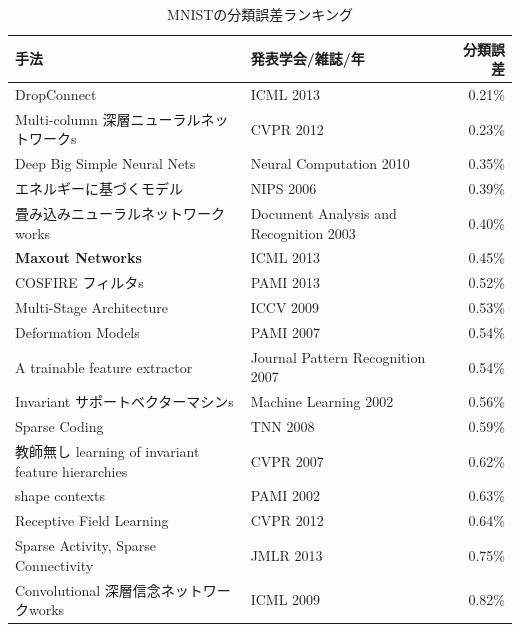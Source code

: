 \begin{table}[htbp]
\begin{center}
  \caption{MNISTの分類誤差ランキング}
    \begin{tabular}{|l|l|r|}\hline
    手法 & 発表学会/雑誌/年 & 分類誤差 \\ \hline
    DropConnect \cite{wan2013regularization}& ICML 2013 & 0.21\% \\ \hline
    Multi-column 深層ニューラルネットワークs \cite{ciresan2012multi-column}& CVPR 2012 & 0.23\% \\ \hline
    Deep Big Simple Neural Nets \cite{ciresan2010deep}& Neural Computation 2010 & 0.35\% \\ \hline
    エネルギーに基づくモデル \cite{poultney2006efficient}& NIPS 2006 & 0.39\% \\ \hline
    畳み込みニューラルネットワークworks \cite{simard2003best}& Document Analysis and Recognition 2003 & 0.40\% \\ \hline
    \textbf{Maxout Networks} \cite{goodfellow2013maxout}& ICML 2013 & 0.45\% \\ \hline
    COSFIRE フィルタs \cite{azzopardi2013trainable}& PAMI 2013 & 0.52\% \\ \hline
    Multi-Stage Architecture \cite{jarrett2009what}& ICCV 2009 & 0.53\% \\ \hline
    Deformation Models \cite{keysers2007deformation}& PAMI 2007 & 0.54\% \\ \hline
    A trainable feature extractor \cite{lauer2007a-trainable}& Journal Pattern Recognition 2007   & 0.54\% \\ \hline
    Invariant サポートベクターマシンs \cite{decoste2002training}& Machine Learning 2002 & 0.56\% \\ \hline
    Sparse Coding \cite{labusch2008simple}& TNN 2008 & 0.59\% \\ \hline
    教師無し learning of invariant feature hierarchies \cite{ranzato2007教師無し}& CVPR 2007 & 0.62\% \\ \hline
    shape contexts \cite{belongie2002shape}& PAMI 2002 & 0.63\% \\ \hline
    Receptive Field Learning \cite{jia2012beyond}& CVPR 2012 & 0.64\% \\ \hline
    Sparse Activity, Sparse Connectivity \cite{thom2013sparse}& JMLR 2013 & 0.75\% \\ \hline
    Convolutional 深層信念ネットワークworks \cite{lee2009convolutional}& ICML 2009 & 0.82\% \\ \hline

\end{tabular}
\end{center}
\end{table}
